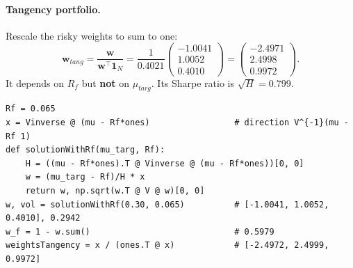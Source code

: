 \documentclass[11pt,a4paper]{report}
\newcommand{\one}{\mathbf{1}_N}
\newcommand{\w}{\bm{w}}
\newcommand{\T}{^{\top}}
\begin{document}
\paragraph{Tangency portfolio.} Rescale the risky weights to sum to one:
\[
\w_{tang}=\frac{\w}{\w\T\one}=\frac{1}{0.4021}\begin{pmatrix}-1.0041\\1.0052\\0.4010\end{pmatrix}
=\begin{pmatrix}-2.4971\\2.4998\\0.9972\end{pmatrix}.
\]
It depends on $R_f$ but \textbf{not} on $\mu_{targ}$. Its Sharpe ratio is $\sqrt H=0.799$.

\begin{lstlisting}
Rf = 0.065
x = Vinverse @ (mu - Rf*ones)                 # direction V^{-1}(mu - Rf 1)
def solutionWithRf(mu_targ, Rf):
    H = ((mu - Rf*ones).T @ Vinverse @ (mu - Rf*ones))[0, 0]
    w = (mu_targ - Rf)/H * x
    return w, np.sqrt(w.T @ V @ w)[0, 0]
w, vol = solutionWithRf(0.30, 0.065)          # [-1.0041, 1.0052, 0.4010], 0.2942
w_f = 1 - w.sum()                             # 0.5979
weightsTangency = x / (ones.T @ x)            # [-2.4972, 2.4999, 0.9972]
\end{lstlisting}
\end{document}
